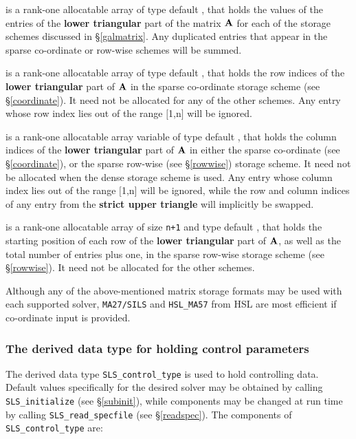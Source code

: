 \documentclass{galahad}
\newcommand{\packagename}{SLS}
\begin{document}
\begin{description}
 is a rank-one allocatable array of type default \realdp, that holds
the values of the entries of the {\bf lower triangular} part
of the matrix ${\mathbf{A}}$ for each of the
storage schemes discussed in \S\ref{galmatrix}.
Any duplicated entries that appear in the sparse
co-ordinate or row-wise schemes will be summed.

 is a rank-one allocatable array of type default \integer,
that holds the row indices of the {\bf lower triangular} part of ${\mathbf{A}}$
in the sparse co-ordinate storage
scheme (see \S\ref{coordinate}).
It need not be allocated for any of the other schemes.
Any entry whose row index lies out of the range $[$1,n$]$ will be ignored.

 is a rank-one allocatable array variable of type default \integer,
that holds the column indices of the {\bf lower triangular} part of
${\mathbf{A}}$ in either the sparse co-ordinate
(see \S\ref{coordinate}), or the sparse row-wise
(see \S\ref{rowwise}) storage scheme.
It need not be allocated when the dense
storage scheme is used.
Any entry whose column index lies out of the range $[$1,n$]$ will be ignored,
while the row and column indices of any entry from the
{\bf strict upper triangle} will implicitly be swapped.

 is a rank-one allocatable array of size {\tt n+1} and type
default \integer, that holds the starting position of
each row of the {\bf lower triangular} part of ${\mathbf{A}}$, as well
as the total number of entries plus one, in the sparse row-wise storage
scheme (see \S\ref{rowwise}). It need not be allocated for the
other schemes.

\end{description}
Although any of the above-mentioned matrix storage formats may be used
with each supported solver, {\tt MA27/SILS} and {\tt HSL\_MA57}
from HSL are most efficient if co-ordinate input is provided.


\subsubsection{The derived data type for holding control
 parameters}\label{typecontrol}
The derived data type
{\tt \packagename\_control\_type}
is used to hold controlling data.
Default values specifically for the desired solver
may be obtained by calling
{\tt \packagename\_initialize}
(see \S\ref{subinit}),
while components may be changed at run time by calling
{\tt \packagename\_read\-\_specfile}
(see \S\ref{readspec}).
The components of
{\tt \packagename\_control\_type}
are:
\end{document}

